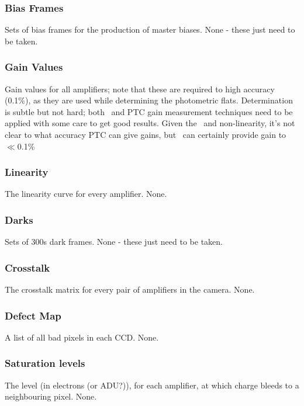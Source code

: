 \subsubsection{Bias Frames}\label{sec:calibInputs:biases} 
Sets of bias frames for the production of master biases.
\alg None - these just need to be taken.


\subsubsection{Gain Values}\label{sec:calibInputs:gain} 
\cameraTeam
Gain values for all amplifiers;  note that these are required to high accuracy (0.1\%), as they are used while determining the photometric flats.
\alg Determination is subtle but not hard; both \fefiftyfive\ and PTC gain measurement techniques need to be applied with some care to get good results. Given the \bfeffect\ and non-linearity, it's not clear to what accuracy PTC can give gains, but \fefiftyfive\ can certainly provide gain to $\ll$0.1\% 


\subsubsection{Linearity}\label{sec:calibInputs:linearityCurve} 
\cameraTeam
The linearity curve for every amplifier.
\alg None.


\subsubsection{Darks}\label{sec:calibInputs:dark}
Sets of 300s dark frames.
\alg None - these just need to be taken.


\subsubsection{Crosstalk}\label{sec:calibInputs:crosstalk}
\cameraTeam
The crosstalk matrix for every pair of amplifiers in the camera.
\alg None.


\subsubsection{Defect Map}\label{sec:calibInputs:defectList} 
\cameraTeam
A list of all bad pixels in each CCD.
\alg None.


\subsubsection{Saturation levels}\label{sec:calibInputs:saturationLevel}
\cameraTeam
The level (in electrons (or ADU?)), for each amplifier, at which charge bleeds to a neighbouring pixel. 
\alg None.


